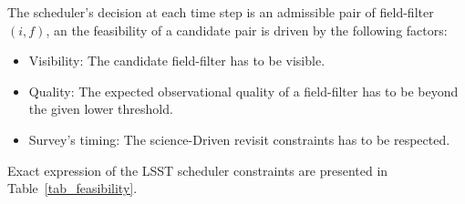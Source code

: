 \documentclass[12pt]{aastex62}
\theoremstyle{definition}
\begin{document}
The scheduler's decision at each time step is an admissible pair of field-filter $(i,f)$, an the feasibility of a candidate pair is driven by the following factors:

\begin{itemize}
\item Visibility: The candidate field-filter has to be visible.
\item Quality: The expected observational quality of a field-filter has to be beyond the given lower threshold.
\item Survey's timing: The science-Driven revisit constraints has to be respected.
\end{itemize}

Exact expression of the LSST scheduler constraints are presented in Table~\ref{tab_feasibility}.
\end{document}
